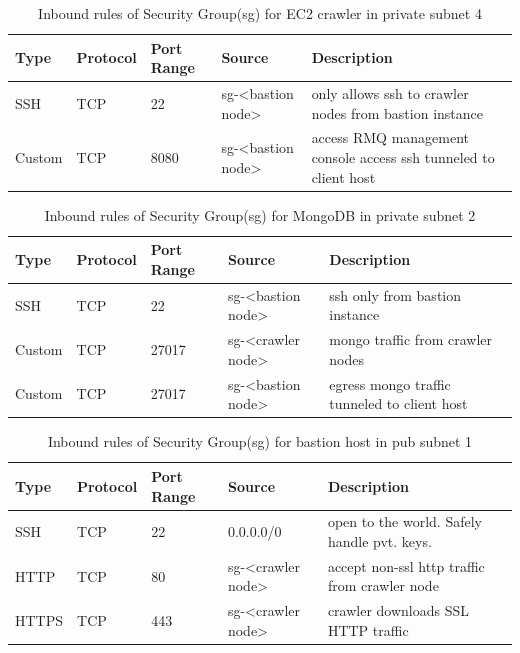 \begin{center}
  \begin{table}[h!]
  \begin{tabular}{| l | l | l | l | p{5cm} |}
    \textbf{Type} & \textbf{Protocol} & \textbf{Port Range} & \textbf{Source} & \textbf{Description} \\
    \hline
    SSH & TCP & 22 & sg-<bastion node> & only allows ssh to crawler nodes from bastion instance \\
    \hline
    Custom & TCP & 8080 & sg-<bastion node> & access RMQ management console access ssh tunneled to client host \\
  \end{tabular}
  \caption{Inbound rules of Security Group(sg) for EC2 crawler in private subnet 4}
  \end{table}
\end{center}

\begin{center}
  \begin{table}[h!]
    \begin{tabular}{| l | l | l | l | p{5cm} |}
      \textbf{Type} & \textbf{Protocol} & \textbf{Port Range} & \textbf{Source} & \textbf{Description} \\
      \hline
      SSH & TCP & 22 & sg-<bastion node> & ssh only from bastion instance \\
      \hline
      Custom & TCP & 27017 & sg-<crawler node> & mongo traffic from crawler nodes \\
      \hline
      Custom & TCP & 27017 & sg-<bastion node> & egress mongo traffic tunneled to client host \\
    \end{tabular}
    \caption{Inbound rules of Security Group(sg) for MongoDB in private subnet 2}
  \end{table}
\end{center}

\begin{center}
  \begin{table}[h!]
  \begin{tabular}{| l | l | l | l | p{5cm} |}
    \textbf{Type} & \textbf{Protocol} & \textbf{Port Range} & \textbf{Source} & \textbf{Description} \\
    \hline
    SSH & TCP & 22 & 0.0.0.0/0 & open to the world. Safely handle pvt. keys.\\
    \hline
    HTTP & TCP & 80 & sg-<crawler node> & accept non-ssl http traffic from crawler node \\
    \hline
    HTTPS & TCP & 443 & sg-<crawler node> & crawler downloads SSL HTTP traffic \\
  \end{tabular}
  \caption{Inbound rules of Security Group(sg) for bastion host in pub subnet 1}
  \end{table}
\end{center}

